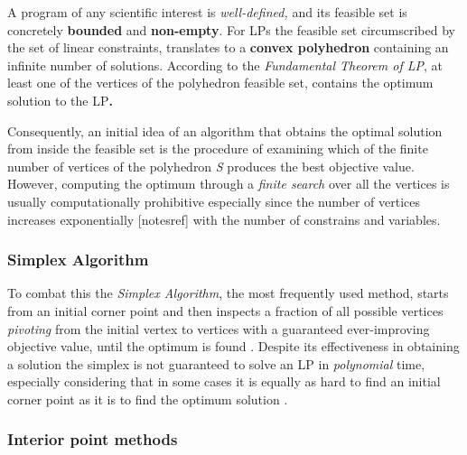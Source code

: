 \vspace{\baselineskip}
\noindent
A program of any scientific interest is \textit{well-defined,} and its feasible set is concretely \textbf{bounded} and \textbf{non-empty}. For LPs the feasible set circumscribed by the set of linear constraints, translates to a \textbf{convex polyhedron} containing an infinite number of solutions. According to the \textit{Fundamental Theorem of LP}, at least one of the vertices of the polyhedron feasible set, contains the optimum solution to the LP\textbf{.}\par
\vspace{\baselineskip}
\noindent
Consequently, an initial idea of an algorithm that obtains the optimal solution from inside the feasible set is the procedure of examining which of the finite number of vertices of the polyhedron \textit{S} produces the best objective value. However, computing the optimum through a \textit{finite search} over all the vertices is usually computationally prohibitive especially since the number of vertices increases exponentially [notesref] with the number of constrains and variables.\par



\subsubsection*{Simplex Algorithm}
To combat this the \textit{Simplex Algorithm}, the most frequently used method, starts from an initial corner point and then inspects a fraction of all possible vertices \textit{pivoting} from the initial vertex to vertices with a guaranteed ever-improving objective value, until the optimum is found \cite{DUMMY:3}. Despite its effectiveness in obtaining a solution the simplex is not guaranteed to solve an LP in \textit{polynomial} time, especially considering that in some cases it is equally as hard to find an initial corner point as it is to find the optimum solution \cite{DUMMY:2}. \par


\subsubsection*{Interior point methods}

